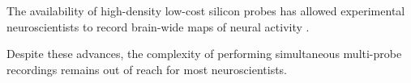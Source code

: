 

The availability of high-density low-cost silicon probes has allowed experimental neuroscientists to record brain-wide maps of neural activity \citep{jun2017fully}. 


Despite these advances, the complexity of performing simultaneous multi-probe recordings remains out of reach for most neuroscientists. 